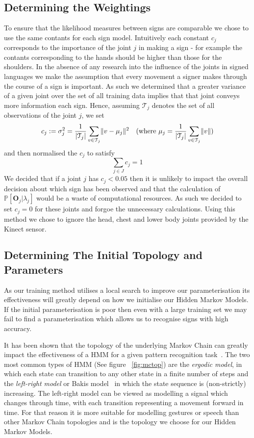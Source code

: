 \subsection{Determining the Weightings}
To ensure that the likelihood measures between signs are comparable we chose to use the same contants for each sign model. Intuitively each constant $c_j$ corresponds to the importance of the joint $j$ in making a sign - for example the contants corresponding to the hands should be higher than those for the shoulders. In the absence of any research into the influence of the joints in signed languages we make the assumption that every movement a signer makes through the course of a sign is important. As such we determined that a greater variance of a given joint over the set of all training data implies that that joint conveys more information each sign. Hence, assuming $\mathcal{T}_j$ denotes the set of all observations of the joint $j$, we set
\begin{align*}
c_j := \sigma^2_j &= \frac{1}{\lvert\mathcal{T}_j\rvert}\sum_{v \in \mathcal{T}_j} \lVert v - \mu_j\rVert^2 &(\text{where } \mu_j = \frac{1}{\lvert\mathcal{T}_j\rvert}\sum_{v \in\mathcal{T}_j}\lVert v\rVert)
\end{align*}
and then normalised the $c_j$ to satisfy
\begin{equation*}
\sum_{j \in J} c_j = 1
\end{equation*}
We decided that if a joint $j$ has $c_j < 0.05$ then it is unlikely  to impact the overall decision about which sign has been observed and that the calculation of $\mathbb{P}[\mathbf{O}_j | \lambda_j]$ would be a waste of computational resources. As such we decided to set $c_j = 0$ for these joints and forgoe the unnecessary calculations. Using this method we chose to ignore the head, chest and lower body joints provided by the Kinect sensor.

\subsection{Determining The Initial Topology and Parameters}
As our training method utilises a local search to improve our parameterisation its effectiveness will greatly depend on how we initialise our Hidden Markov Models. If the initial parameterisation is poor then even with a large training set we may fail to find a parameterisation which allows us to recognise signs with high accuracy.

It has been shown that the topology of the underlying Markov Chain can greatly impact the effectiveness of a HMM for a given pattern recognition task~\citep{rabiner1989tutorial, jelinek1998statistical}. The two most common types of HMM (See figure ~\ref{fig:mctop}) are the \emph{ergodic model}, in which each state can transition to any other state in a finite number of steps and the \emph{left-right model} or Bakis model~\citep{bakis1976continuous} in which the state sequence is (non-strictly) increasing. The left-right model can be viewed as modelling a signal which changes through time, with each transition representing a movement forward in time. For that reason it is more suitable for modelling gestures or speech than other Markov Chain topologies and is the topology we choose for our Hidden Markov Models.

